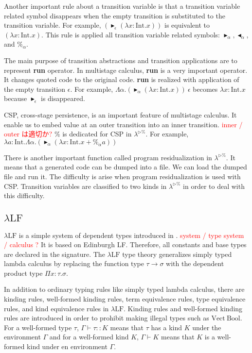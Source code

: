\documentclass[runningheads]{llncs}
\newcommand{\red}[1]{\textcolor{red}{#1 }}
\newcommand{\LTP}{$\lambda^{\triangleright\%}$\xspace}
\newcommand{\LLF}{$\lambda\textrm{LF}$\xspace}
\newcommand{\G}{\Gamma}
\newcommand{\TB}{\blacktriangleright}
\newcommand{\TBL}{\blacktriangleleft}
\newcommand{\I}{\textrm{Int}}
\begin{document}

Another important rule about a transition variable is 
that a transition variable related symbol disappears when the empty transition is substituted to the transition variable.
For example, $(\TB_\epsilon (\lambda x:\I.x))$ is equivalent to $(\lambda x:\I.x)$.
This rule is applied all transition variable related symbols: $\TB_\alpha, \TBL_\alpha$, and $\%_\alpha$.

The main purpose of transition abstractions and transition applications are to represent {\bf{run}} operator.
In multistage calculus, {\bf{run}} is a very important operator.
It changes quoted code to the original code.
{\bf{run}} is realized with application of the empty transition $\epsilon$.
For example, $\Lambda\alpha.(\TB_\alpha (\lambda x:\I.x))\ \epsilon$ becomes $\lambda x:\I.x$
because $\TB_\epsilon$ is disappeared.

CSP, cross-stage persistence, is an important feature of multistage calculus.
It enable us to embed value at an outer transition into an inner transition.
\red{inner / outer は適切か?}
$\%$ is dedicated for CSP in \LTP.
For example, $\lambda a:\I.\Lambda\alpha.(\TB_\alpha (\lambda x:\I.x+\%_\alpha a))$


There is another important function called program residualization in \LTP.
It means that a generated code can be dumped into a file.
We can load the dumped file and run it.
The difficulty is arise when program residualization is used with CSP.
Transition variables are classified to two kinds in \LTP in order to deal with this difficulty.

\subsection{\LLF}

\LLF is a simple system of dependent types introduced in \cite{attapl}.
\red{system / type system / calculus ?}
It is based on Edinburgh LF\cite{harper1993framework}.
Therefore, all constants and base types are declared in the signature.
The \LLF type theory generalizes simply typed lambda calculus
by replacing the function type $\tau\to\sigma$ with the dependent product type $\Pi x:\tau.\sigma$.

In addition to ordinary typing rules like simply typed lambda calculus,
there are kinding rules, well-formed kinding rules, term equivalence rules, type equivalence rules, and kind equivalence rules in \LLF.
Kinding rules and well-formed kinding rules are 
introduced in order to prohibit making illegal types such as $\textrm{Vect}\ \textrm{Bool}$.
For a well-formed type $\tau$, $\G \vdash \tau :: K$ means that $\tau$ has a kind $K$ under the environment $\G$ and 
for a well-formed kind $K$, $\G \vdash K$ means that $K$ is a well-formed kind under en environment $\G$.
\end{document}
